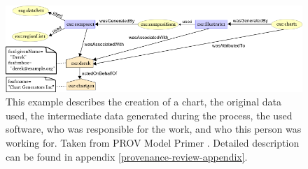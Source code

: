 \begin{figure}[h]
	\centering
	\includegraphics[width=1.0\linewidth]{images/provenance-large-schema}
	\caption{
		This example describes the creation of a chart, the original data used, the intermediate data generated during the process, the used software, who was responsible for the work, and who this person was working for.
		Taken from PROV Model Primer \cite{dsp8gil}.
		Detailed description can be found in appendix \ref{provenance-review-appendix}.
	}
	\label{fig:provenance-schema-text}
\end{figure}